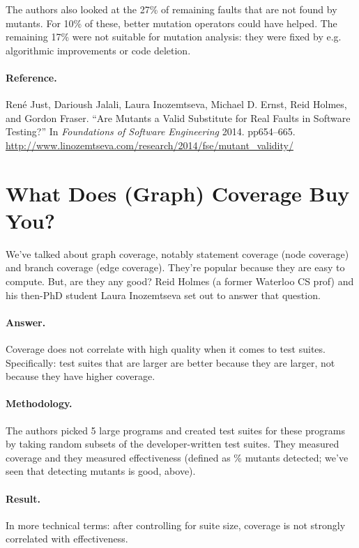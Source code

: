 \documentclass[11pt]{article}
\begin{document}
The authors also looked at the 27\% of remaining faults that
are not found by mutants. For 10\% of these, better mutation operators
could have helped. The remaining 17\% were not suitable for mutation analysis:
they were fixed by e.g. algorithmic improvements or code deletion.

\paragraph{Reference.}
Ren\'e Just, Darioush Jalali, Laura Inozemtseva, Michael D. Ernst,
Reid Holmes, and Gordon Fraser. ``Are Mutants a Valid Substitute for
Real Faults in Software Testing?''  In {\em Foundations of Software
Engineering} 2014. pp654--665.
\url{http://www.linozemtseva.com/research/2014/fse/mutant_validity/}

\section*{What Does (Graph) Coverage Buy You?}
We've talked about graph coverage, notably statement coverage (node
coverage) and branch coverage (edge coverage). They're popular because
they are easy to compute. But, are they any good? Reid Holmes (a
former Waterloo CS prof) and his then-PhD student Laura Inozemtseva set out to answer
that question.

\paragraph{Answer.} Coverage does not correlate with high quality
when it comes to test suites.
Specifically: test suites that are larger are better because
they are larger, not because they have higher coverage.

\paragraph{Methodology.} The authors picked 5 large programs
and created test suites for these programs by taking random
subsets of the developer-written test suites. They measured
coverage and they measured effectiveness (defined as \% mutants
detected; we've seen that detecting mutants is good, above).

\paragraph{Result.} In more technical terms: after controlling
for suite size, coverage is not strongly correlated with effectiveness.
\end{document}

